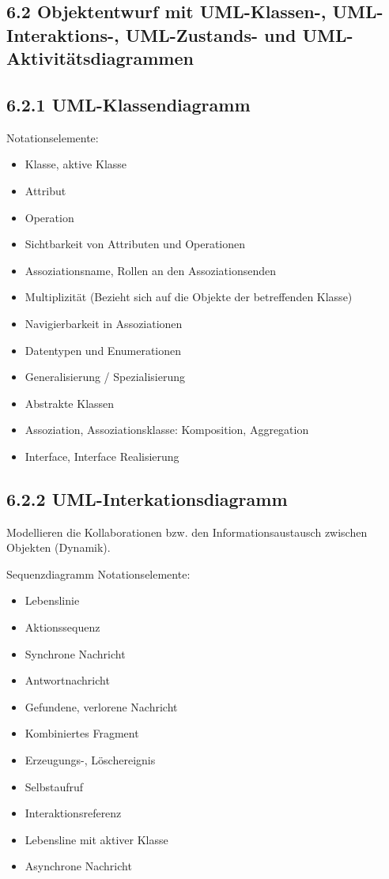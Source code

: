 \subsection*{6.2 Objektentwurf mit UML-Klassen-, UML-Interaktions-, UML-Zustands- und UML-Aktivitätsdiagrammen}
\subsection*{6.2.1 UML-Klassendiagramm}
Notationselemente:

\begin{itemize}
  \item Klasse, aktive Klasse
  \item Attribut
  \item Operation
  \item Sichtbarkeit von Attributen und Operationen
  \item Assoziationsname, Rollen an den Assoziationsenden
  \item Multiplizität (Bezieht sich auf die Objekte der betreffenden Klasse)
  \item Navigierbarkeit in Assoziationen
  \item Datentypen und Enumerationen
  \item Generalisierung / Spezialisierung
  \item Abstrakte Klassen
  \item Assoziation, Assoziationsklasse: Komposition, Aggregation
  \item Interface, Interface Realisierung
\end{itemize}

\subsection*{6.2.2 UML-Interkationsdiagramm}
Modellieren die Kollaborationen bzw. den Informationsaustausch zwischen Objekten (Dynamik).

Sequenzdiagramm Notationselemente:

\begin{itemize}
  \item Lebenslinie
  \item Aktionssequenz
  \item Synchrone Nachricht
  \item Antwortnachricht
  \item Gefundene, verlorene Nachricht
  \item Kombiniertes Fragment
  \item Erzeugungs-, Löschereignis
  \item Selbstaufruf
  \item Interaktionsreferenz
  \item Lebensline mit aktiver Klasse
  \item Asynchrone Nachricht
\end{itemize}

